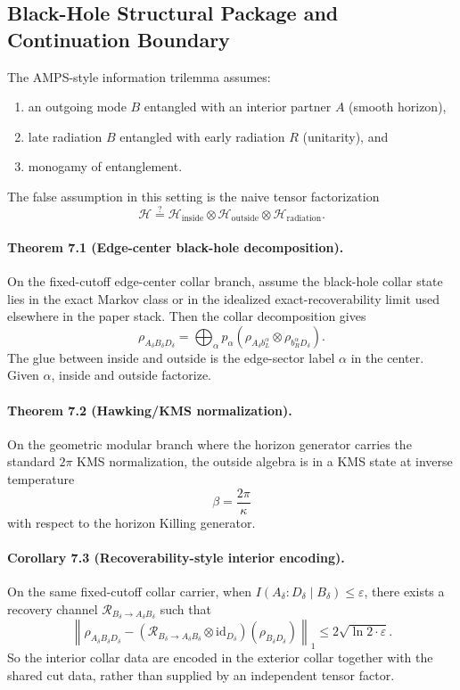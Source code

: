 \subsection{Black-Hole Structural Package and Continuation Boundary}

The AMPS-style information trilemma assumes:
\begin{enumerate}[leftmargin=2em]
\item an outgoing mode \(B\) entangled with an interior partner \(A\) (smooth horizon),
\item late radiation \(B\) entangled with early radiation \(R\) (unitarity), and
\item monogamy of entanglement.
\end{enumerate}
The false assumption in this setting is the naive tensor factorization
\[
\mathcal H \stackrel{?}{=}
\mathcal H_{\mathrm{inside}}\otimes
\mathcal H_{\mathrm{outside}}\otimes
\mathcal H_{\mathrm{radiation}}.
\]

\paragraph{\textbf{Theorem 7.1 (Edge-center black-hole decomposition).}}
On the fixed-cutoff edge-center collar branch, assume the black-hole collar state lies in the
exact Markov class or in the idealized exact-recoverability limit used elsewhere in the paper
stack. Then the collar decomposition gives
\[
\rho_{A_\delta B_\delta D_\delta}
=
\bigoplus_\alpha p_\alpha
\left(\rho_{A_\delta b_L^\alpha}\otimes \rho_{b_R^\alpha D_\delta}\right).
\]
The glue between inside and outside is the edge-sector label \(\alpha\) in the center.
Given \(\alpha\), inside and outside factorize.

\paragraph{\textbf{Theorem 7.2 (Hawking/KMS normalization).}}
On the geometric modular branch where the horizon generator carries the standard \(2\pi\) KMS
normalization, the outside algebra is in a KMS state at inverse temperature
\[
\beta=\frac{2\pi}{\kappa}
\]
with respect to the horizon Killing generator.

\paragraph{\textbf{Corollary 7.3 (Recoverability-style interior encoding).}}
On the same fixed-cutoff collar carrier, when
\(I(A_\delta:D_\delta\mid B_\delta)\le\varepsilon\), there exists a recovery channel
\(\mathcal R_{B_\delta\to A_\delta B_\delta}\) such that
\[
\left\|
\rho_{A_\delta B_\delta D_\delta}
-
(\mathcal R_{B_\delta\to A_\delta B_\delta}\otimes \mathrm{id}_{D_\delta})(\rho_{B_\delta D_\delta})
\right\|_1
\le
2\sqrt{\ln 2\cdot \varepsilon}.
\]
So the interior collar data are encoded in the exterior collar together with the shared cut data,
rather than supplied by an independent tensor factor.

